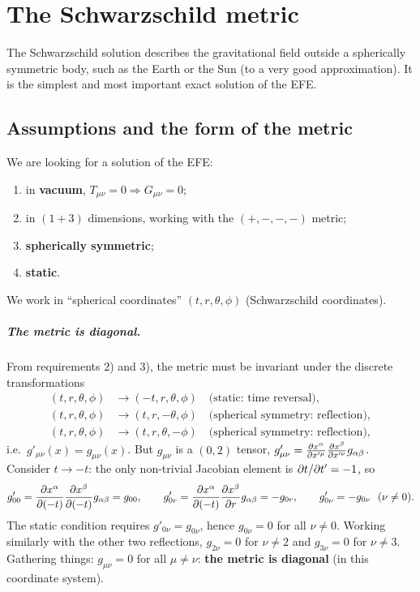 \chapter{The Schwarzschild metric}\label{ch:schwarzschild}

The Schwarzschild solution describes the gravitational field outside a spherically symmetric body, such as the Earth or the Sun (to a very good approximation). It is the simplest and most important exact solution of the EFE.

\section{Assumptions and the form of the metric}

We are looking for a solution of the EFE:
\begin{enumerate}[label=\arabic*),start=0,nosep]
\item in \textbf{vacuum}, $T_{\mu\nu}=0\Rightarrow G_{\mu\nu}=0$;
\item in $(1+3)$ dimensions, working with the $(+,-,-,-)$ metric;
\item \textbf{spherically symmetric};
\item \textbf{static}.
\end{enumerate}
We work in ``spherical coordinates'' $(t,r,\theta,\phi)$ (Schwarzschild coordinates).

\paragraph{The metric is diagonal.} From requirements 2) and 3), the metric must be invariant under the discrete transformations
\begin{align*}
  (t,r,\theta,\phi)&\to(-t,r,\theta,\phi)\quad\text{(static: time reversal)},\\
  (t,r,\theta,\phi)&\to(t,r,-\theta,\phi)\quad\text{(spherical symmetry: reflection)},\\
  (t,r,\theta,\phi)&\to(t,r,\theta,-\phi)\quad\text{(spherical symmetry: reflection)},
\end{align*}
i.e.\ $g'_{\mu\nu}(x)=g_{\mu\nu}(x)$. But $g_{\mu\nu}$ is a $(0,2)$ tensor, $g'_{\mu\nu}=\frac{\partial x^\alpha}{\partial x'^\mu}\frac{\partial x^\beta}{\partial x'^\nu}g_{\alpha\beta}$. Consider $t\to-t$: the only non-trivial Jacobian element is $\partial t/\partial t'=-1$, so
\[
  g'_{00}=\frac{\pd x^\alpha}{\pd(-t)}\frac{\pd x^\beta}{\pd(-t)}g_{\alpha\beta}=g_{00},\qquad
  g'_{0r}=\frac{\pd x^\alpha}{\pd(-t)}\frac{\pd x^\beta}{\pd r}g_{\alpha\beta}=-g_{0r},\qquad g'_{0\nu}=-g_{0\nu}\ \ (\nu\neq0).
\]
The static condition requires $g'_{0\nu}=g_{0\nu}$, hence $g_{0\nu}=0$ for all $\nu\neq0$. Working similarly with the other two reflections, $g_{2\nu}=0$ for $\nu\neq2$ and $g_{3\nu}=0$ for $\nu\neq3$. Gathering things: $g_{\mu\nu}=0$ for all $\mu\neq\nu$: \textbf{the metric is diagonal} (in this coordinate system).

